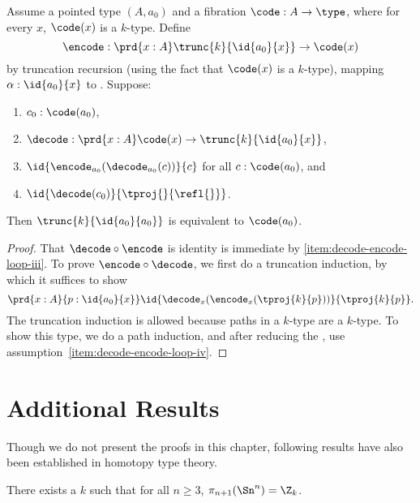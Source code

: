 \begin{lem}
Assume a pointed type $(A,a_0)$ and a fibration
$\code : A \to \type$, where for every $x$, $\code(x)$ is a $k$-type.
Define
\[
\encode : \prd{x:A} \trunc{k}{\id{a_0}{x}} \to \code(x)
\]
by truncation recursion (using the fact
that $\code(x)$ is a $k$-type), mapping $\alpha : \id{a_0}{x}$ to
. Suppose:
\begin{enumerate}
\item $c_0 : \code(a_0)$,
\item $\decode : \prd{x:A} \code(x) \to \trunc{k}{\id{a_0}{x}}$,
\item \label{item:decode-encode-loop-iii}
  $\id{\encode_{a_0}(\decode_{a_0}(c))}{c}$ for all $c : \code(a_0)$, and
\item \label{item:decode-encode-loop-iv}
  $\id{\decode(c_0)}{\tproj{}{\refl{}}}$.
\end{enumerate}
Then $\trunc{k}{\id{a_0}{a_0}}$ is equivalent to $\code(a_0)$.
\end{lem}

\begin{proof}
That $\decode \circ \encode$ is identity is immediate by \ref{item:decode-encode-loop-iii}.
%
To prove $\encode \circ \decode$, we first do a truncation induction, by
which it suffices to show
\[
\prd{x:A}{p : \id{a_0}{x}} \id{\decode_{x}(\encode_{x}(\tproj{k}{p}))}{\tproj{k}{p}}.
\]
The truncation induction is allowed because paths in a $k$-type are a
$k$-type.  To show this type, we do a path induction, and after reducing
the \encode, use assumption~\ref{item:decode-encode-loop-iv}.
\end{proof}

\section{Additional Results}
\label{sec:moreresults}

Though we do not present the proofs in this chapter, following results have also been established in homotopy type theory.

\begin{thm}
There exists a $k$ such that for all $n \ge 3$, $\pi_{n+1}(\Sn ^n) =
\Z_k$.
\end{thm}

